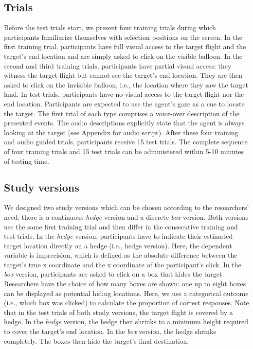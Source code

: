 \documentclass[
  man,floatsintext]{apa6}
\begin{document}
\hypertarget{trials}{%
\subsection{Trials}\label{trials}}

Before the test trials start, we present four training trials during which participants familiarize themselves with selection positions on the screen. In the first training trial, participants have full visual access to the target flight and the target's end location and are simply asked to click on the visible balloon. In the second and third training trials, participants have partial visual access: they witness the target flight but cannot see the target's end location. They are then asked to click on the invisible balloon, i.e., the location where they saw the target land. In test trials, participants have no visual access to the target flight nor the end location. Participants are expected to use the agent's gaze as a cue to locate the target. The first trial of each type comprises a voice-over description of the presented events. The audio descriptions explicitly state that the agent is always looking at the target (see Appendix for audio script). After these four training and audio guided trials, participants receive 15 test trials. The complete sequence of four training trials and 15 test trials can be administered within 5-10 minutes of testing time.

\hypertarget{study-versions}{%
\subsection{Study versions}\label{study-versions}}

We designed two study versions which can be chosen according to the researchers' need: there is a continuous \emph{hedge} version and a discrete \emph{box} version. Both versions use the same first training trial and then differ in the consecutive training and test trials.
In the \emph{hedge} version, participants have to indicate their estimated target location directly on a hedge (i.e., hedge version).
Here, the dependent variable is imprecision, which is defined as the absolute difference between the target's true x coordinate and the x coordinate of the participant's click.
In the \emph{box} version, participants are asked to click on a box that hides the target. Researchers have the choice of how many boxes are shown: one up to eight boxes can be displayed as potential hiding locations. Here, we use a categorical outcome (i.e., which box was clicked) to calculate the proportion of correct responses.
Note that in the test trials of both study versions, the target flight is covered by a hedge. In the \emph{hedge} version, the hedge then shrinks to a minimum height required to cover the target's end location. In the \emph{box} version, the hedge shrinks completely. The boxes then hide the target's final destination.
\end{document}
